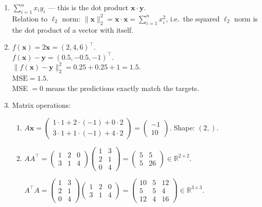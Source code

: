 \documentclass[12pt, a4paper]{scrartcl}
\begin{document}
\begin{enumerate}

\item $\displaystyle\sum_{i=1}^{n} x_i y_i$ --- this is the dot product $\mathbf{x} \cdot \mathbf{y}$.\\
Relation to $\ell_2$ norm: $\|\mathbf{x}\|_2^2 = \mathbf{x} \cdot \mathbf{x} = \displaystyle\sum_{i=1}^{n} x_i^2$, i.e.\ the squared $\ell_2$ norm is the dot product of a vector with itself.

\item $f(\mathbf{x}) = 2\mathbf{x} = (2, 4, 6)^\top$.\\
$f(\mathbf{x}) - \mathbf{y} = (0.5, -0.5, -1)^\top$.\\
$\|f(\mathbf{x}) - \mathbf{y}\|_2^2 = 0.25 + 0.25 + 1 = 1.5$.\\
$\mathrm{MSE} = 1.5$.\\
MSE $= 0$ means the predictions exactly match the targets.

\item Matrix operations:
\begin{enumerate}
    \item $A\mathbf{x} = \begin{pmatrix} 1\cdot1 + 2\cdot(-1) + 0\cdot2 \\ 3\cdot1 + 1\cdot(-1) + 4\cdot2 \end{pmatrix} = \begin{pmatrix} -1 \\ 10 \end{pmatrix}$. Shape: $(2,)$.

    \item $AA^\top = \begin{pmatrix} 1 & 2 & 0 \\ 3 & 1 & 4 \end{pmatrix} \begin{pmatrix} 1 & 3 \\ 2 & 1 \\ 0 & 4 \end{pmatrix} = \begin{pmatrix} 5 & 5 \\ 5 & 26 \end{pmatrix} \in \mathbb{R}^{2\times2}$.

    $A^\top A = \begin{pmatrix} 1 & 3 \\ 2 & 1 \\ 0 & 4 \end{pmatrix}\begin{pmatrix} 1 & 2 & 0 \\ 3 & 1 & 4 \end{pmatrix} = \begin{pmatrix} 10 & 5 & 12 \\ 5 & 5 & 4 \\ 12 & 4 & 16 \end{pmatrix} \in \mathbb{R}^{3\times3}$.


\end{enumerate}
\end{enumerate}
\end{document}
